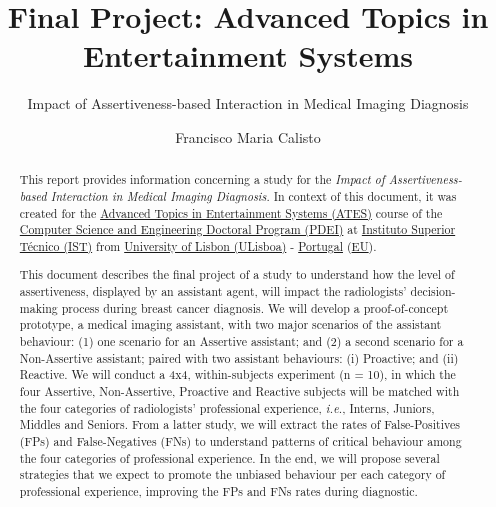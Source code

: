 \documentclass[sigchi]{acmart}
\begin{document}
\title[Final Project]{\normalsize Final Project: Advanced Topics in Entertainment Systems}
\subtitle{Impact of Assertiveness-based Interaction in Medical Imaging Diagnosis}

\author{Francisco Maria Calisto}

\renewcommand{\shortauthors}{Calisto}


\begin{abstract}

This report provides information concerning a study for the \textit{Impact of Assertiveness-based Interaction in Medical Imaging Diagnosis}.
In context of this document, it was created for the \hyperlink{https://fenix.tecnico.ulisboa.pt/disciplinas/TASE4/2019-2020/2-semestre}{Advanced Topics in Entertainment Systems (ATES)} course of the \hyperlink{https://fenix.tecnico.ulisboa.pt/cursos/deic/curriculo}{Computer Science and Engineering Doctoral Program (PDEI)} at \hyperlink{https://tecnico.ulisboa.pt/en/}{Instituto Superior T\'{e}cnico (IST)} from \hyperlink{https://www.ulisboa.pt/}{University of Lisbon (ULisboa)} - \hyperlink{https://www.portugal.gov.pt/en/}{Portugal} (\hyperlink{https://europa.eu}{EU}).

This document describes the final project of a study to understand how the level of assertiveness, displayed by an assistant agent, will impact the radiologists' decision-making process during breast cancer diagnosis.
We will develop a proof-of-concept prototype, a medical imaging assistant, with two major scenarios of the assistant behaviour:
(1) one scenario for an Assertive assistant; and
(2) a second scenario for a Non-Assertive assistant;
paired with two assistant behaviours:
(i) Proactive; and
(ii) Reactive.
We will conduct a 4x4, within-subjects experiment (n = 10), in which the four Assertive, Non-Assertive, Proactive and Reactive subjects will be matched with the four categories of radiologists' professional experience, {\it i.e.}, Interns, Juniors, Middles and Seniors.
From a latter study, we will extract the rates of False-Positives (FPs) and False-Negatives (FNs) to understand patterns of critical behaviour among the four categories of professional experience.
In the end, we will propose several strategies that we expect to promote the unbiased behaviour per each category of professional experience, improving the FPs and FNs rates during diagnostic.

\end{abstract}
\end{document}
